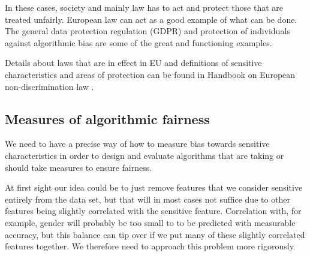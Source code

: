 In these cases, society and mainly law has to act and protect those that are treated unfairly. European law can act as a good example of what can be done. The general data protection regulation (GDPR) and protection of individuals against algorithmic bias are some of the great and functioning examples.

Details about laws that are in effect in EU and definitions of sensitive characteristics and areas of protection can be found in Handbook on European non-discrimination law \cite{european-union-agency-for-fundamental-rights-2018}.


\subsection{Measures of algorithmic fairness}
We need to have a precise way of how to measure bias towards sensitive characteristics in order to design and evaluate algorithms that are taking or should take measures to ensure fairness. 

At first sight our idea could be to just remove features that we consider sensitive entirely from the data set, but that will in most cases not suffice due to other features being slightly correlated with the sensitive feature. Correlation with, for example, gender will probably be too small to to be predicted with measurable accuracy, but this balance can tip over if we put many of these slightly correlated features together. We therefore need to approach this problem more rigorously.

